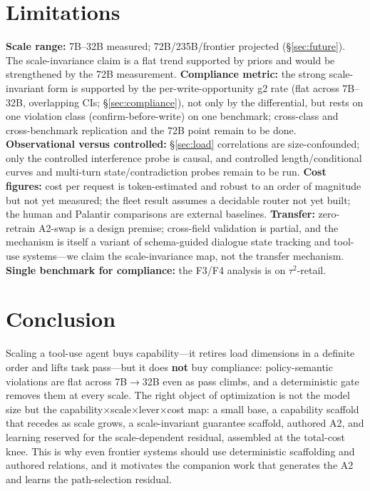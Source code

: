\documentclass[10pt]{article}
\begin{document}
\section{Limitations}\label{sec:limits}
\textbf{Scale range:} 7B--32B measured; 72B/235B/frontier projected (\S\ref{sec:future}). The scale-invariance claim is a flat trend supported by priors and would be strengthened by the 72B measurement. \textbf{Compliance metric:} the strong scale-invariant form is supported by the per-write-opportunity g2 rate (flat across 7B--32B, overlapping CIs; \S\ref{sec:compliance}), not only by the differential, but rests on one violation class (confirm-before-write) on one benchmark; cross-class and cross-benchmark replication and the 72B point remain to be done. \textbf{Observational versus controlled:} \S\ref{sec:load} correlations are size-confounded; only the controlled interference probe is causal, and controlled length/conditional curves and multi-turn state/contradiction probes remain to be run. \textbf{Cost figures:} cost per request is token-estimated and robust to an order of magnitude but not yet measured; the fleet result assumes a decidable router not yet built; the human and Palantir comparisons are external baselines. \textbf{Transfer:} zero-retrain A2-swap is a design premise; cross-field validation is partial, and the mechanism is itself a variant of schema-guided dialogue state tracking and tool-use systems---we claim the scale-invariance map, not the transfer mechanism. \textbf{Single benchmark for compliance:} the F3/F4 analysis is on $\tau^2$-retail.

\section{Conclusion}
Scaling a tool-use agent buys capability---it retires load dimensions in a definite order and lifts task pass---but it does \textbf{not} buy compliance: policy-semantic violations are flat across 7B$\to$32B even as pass climbs, and a deterministic gate removes them at every scale. The right object of optimization is not the model size but the capability$\times$scale$\times$lever$\times$cost map: a small base, a capability scaffold that recedes as scale grows, a scale-invariant guarantee scaffold, authored A2, and learning reserved for the scale-dependent residual, assembled at the total-cost knee. This is why even frontier systems should use deterministic scaffolding and authored relations, and it motivates the companion work that generates the A2 and learns the path-selection residual.

\small


\end{document}

